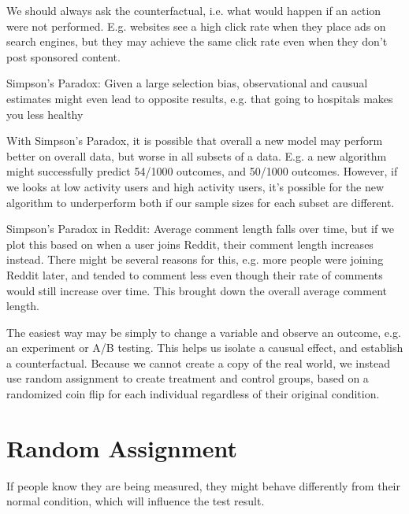 \begin{flushleft}
We should always ask the counterfactual, i.e. what would happen if an action were not performed. E.g. websites see a high click rate when they place ads on search engines, but they may achieve the same click rate even when they don't post sponsored content.
\end{flushleft}

\begin{flushleft}
Simpson's Paradox: Given a large selection bias, observational and causual estimates might even lead to opposite results, e.g. that going to hospitals makes you less healthy
\end{flushleft}

\begin{flushleft}
With Simpson's Paradox, it is possible that overall a new model may perform better on overall data, but worse in all subsets of a data. E.g. a new algorithm might successfully predict 54/1000 outcomes, and 50/1000 outcomes. However, if we looks at low activity users and high activity users, it's possible for the new algorithm to underperform both if our sample sizes for each subset are different.
\end{flushleft}

\begin{flushleft}
Simpson's Paradox in Reddit: Average comment length falls over time, but if we plot this based on when a user joins Reddit, their comment length increases instead. There might be several reasons for this, e.g. more people were joining Reddit later, and tended to comment less even though their rate of comments would still increase over time. This brought down the overall average comment length.
\end{flushleft}

\begin{flushleft}
The easiest way may be simply to change a variable and observe an outcome, e.g. an experiment or A/B testing. This helps us isolate a causual effect, and establish a counterfactual. Because we cannot create a copy of the real world, we instead use random assignment to create treatment and control groups, based on a randomized coin flip for each individual regardless of their original condition.
\end{flushleft}


\section*{Random Assignment}
\begin{flushleft}
If people know they are being measured, they might behave differently from their normal condition, which will influence the test result.
\end{flushleft}

